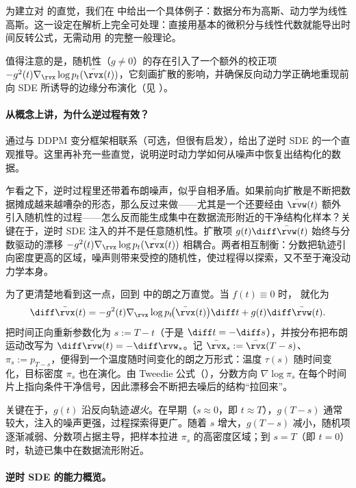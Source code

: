 为建立对  的直觉，我们在  中给出一个具体例子：数据分布为高斯、动力学为线性高斯。这一设定在解析上完全可处理：直接用基本的微积分与线性代数就能导出时间反转公式，无需动用 \citet{anderson1982reverse} 的完整一般理论。

值得注意的是，随机性（$g\neq 0$）的存在引入了一个额外的校正项 $-g^2(t) \nabla_{\rvx} \log p_t(\bar{\rvx}(t))$，它刻画扩散的影响，并确保反向动力学正确地重现前向 SDE 所诱导的边缘分布演化（见 ）。

\paragraph{从概念上讲，为什么逆过程有效？}
 通过与 DDPM 变分框架相联系（可选，但很有启发），给出了逆时 SDE 的一个直观推导。这里再补充一些直觉，说明逆时动力学如何从噪声中恢复出结构化的数据。

乍看之下，逆时过程里还带着布朗噪声，似乎自相矛盾。如果前向扩散是不断把数据摊成越来越嘈杂的形态，那么反过来做——尤其是一个还要经由 $\bar{\rvw}(t)$ 额外引入随机性的过程——怎么反而能生成集中在数据流形附近的干净结构化样本？关键在于，逆时 SDE 注入的并不是任意随机性。扩散项 $g(t)\diff\bar{\rvw}(t)$ 始终与分数驱动的漂移 $- g^2(t)\nabla_{\rvx}\log p_t(\bar{\rvx}(t))$ 相耦合。两者相互制衡：分数把轨迹引向密度更高的区域，噪声则带来受控的随机性，使过程得以探索，又不至于淹没动力学本身。

为了更清楚地看到这一点，回到  中的朗之万直觉。当 $f(t)\equiv 0$ 时， 就化为
\[
\diff\bar{\rvx}(t)
= - g^2(t) \nabla_{\rvx}\log p_t\!\big(\bar{\rvx}(t)\big) \diff t
+ g(t)  \diff\bar{\rvw}(t).
\]
把时间正向重新参数化为 $s:=T-t$（于是 $\diff t=-\diff s$），并按分布把布朗运动改写为 $\diff\bar{\rvw}(t)=-\diff\rvw_s$。记 $\bar{\rvx}_s:=\bar{\rvx}(T-s)$、$\pi_s:=p_{T-s}$，便得到一个温度随时间变化的朗之万形式：温度 $\tau(s)$ 随时间变化，目标密度 $\pi_s$ 也在演化。由 Tweedie 公式（），分数方向 $\nabla\log \pi_s$ 在每个时间片上指向条件干净信号，因此漂移会不断把去噪后的结构“拉回来”。

关键在于，$g(t)$ 沿反向轨迹\emph{退火}。在早期（$s\approx 0$，即 $t\approx T$），$g(T-s)$ 通常较大，注入的噪声更强，过程探索得更广。随着 $s$ 增大，$g(T-s)$ 减小，随机项逐渐减弱、分数项占据主导，把样本拉进 $\pi_s$ 的高密度区域；到 $s=T$（即 $t=0$）时，轨迹已集中在数据流形附近。


\paragraph{逆时 SDE 的能力概览。}


